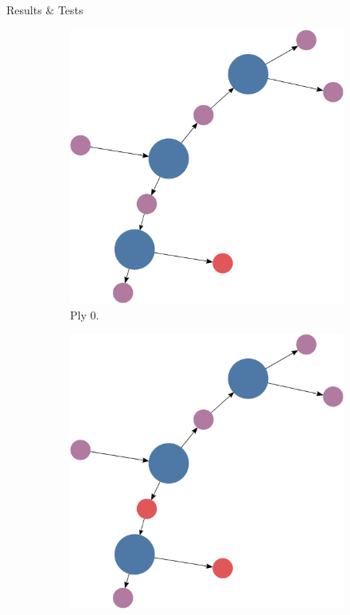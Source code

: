\documentclass[final]{beamer} %
\begin{document}
\begin{frame}
\begin{columns}
\begin{column}{.33\textwidth}
{\begin{block}{Results \& Tests}
				
					\begin{figure}[!htb]
						\centering
						\begin{subfigure}[!htb]{0.19\columnwidth}
							\centering
							\includegraphics[width=\columnwidth]{figures/knn_simple_lambda_think_0.pdf}
							\caption{Ply 0.}
						\end{subfigure}
						\begin{subfigure}[!htb]{0.19\columnwidth}
							\centering
							\includegraphics[width=\columnwidth]{figures/knn_simple_lambda_think_1.pdf}

\end{subfigure}
\end{figure}
\end{block}}
\end{column}
\end{columns}
\end{frame}
\end{document}
